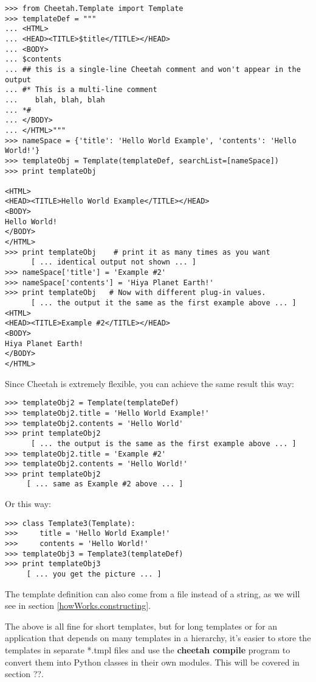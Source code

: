 \begin{verbatim}
>>> from Cheetah.Template import Template
>>> templateDef = """
... <HTML>
... <HEAD><TITLE>$title</TITLE></HEAD>
... <BODY>
... $contents
... ## this is a single-line Cheetah comment and won't appear in the output
... #* This is a multi-line comment
...    blah, blah, blah 
... *#
... </BODY>
... </HTML>"""
>>> nameSpace = {'title': 'Hello World Example', 'contents': 'Hello World!'}
>>> templateObj = Template(templateDef, searchList=[nameSpace])
>>> print templateObj
 
<HTML>
<HEAD><TITLE>Hello World Example</TITLE></HEAD>
<BODY>
Hello World!
</BODY>
</HTML>
>>> print templateObj    # print it as many times as you want
      [ ... identical output not shown ... ]
>>> nameSpace['title'] = 'Example #2'
>>> nameSpace['contents'] = 'Hiya Planet Earth!'
>>> print templateObj   # Now with different plug-in values.
      [ ... the output it the same as the first example above ... ]
<HTML>
<HEAD><TITLE>Example #2</TITLE></HEAD>
<BODY>
Hiya Planet Earth!
</BODY>
</HTML>

\end{verbatim}

Since Cheetah is extremely flexible, you can achieve the same result this
way:  

\begin{verbatim}
>>> templateObj2 = Template(templateDef)
>>> templateObj2.title = 'Hello World Example!'
>>> templateObj2.contents = 'Hello World'
>>> print templateObj2
      [ ... the output is the same as the first example above ... ]
>>> templateObj2.title = 'Example #2'
>>> templateObj2.contents = 'Hello World!'
>>> print templateObj2
     [ ... same as Example #2 above ... ]
\end{verbatim}

Or this way:

\begin{verbatim}
>>> class Template3(Template):
>>>     title = 'Hello World Example!'
>>>     contents = 'Hello World!'
>>> templateObj3 = Template3(templateDef)
>>> print templateObj3
     [ ... you get the picture ... ]
\end{verbatim}

The template definition can also come from a file instead of a string,
as we will see in section \ref{howWorks.constructing}.

The above is all fine for short templates, but for long templates or
for an application that depends on many templates in a hierarchy, it's
easier to store the templates in separate *.tmpl files and use the
{\bf cheetah compile} program to convert them into Python classes in
their own modules.  This will be covered in section ??.  


